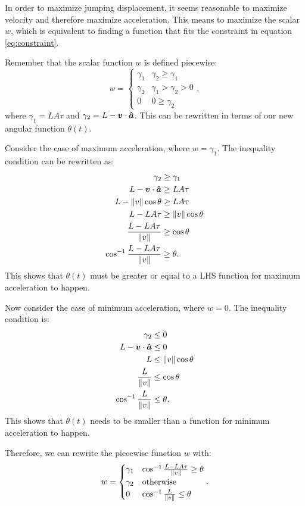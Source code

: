 In order to maximize jumping displacement, it seems reasonable to maximize velocity and therefore maximize acceleration. This means to maximize the scalar $w$, which is equivalent to finding a function that fits the constraint in equation \ref{eq:constraint}.

Remember that the scalar function $w$ is defined piecewise:
\[
    w = \begin{cases}
        \gamma_1 & \gamma_2 \ge \gamma_1\\
     \gamma_2 & \gamma_1 > \gamma_2 > 0\\
     0 & 0 \ge \gamma_2
    \end{cases},
\]
where $\gamma_1 = LA\tau$ and $\gamma_2 = L - \boldsymbol{v} \cdot \boldsymbol{\hat{a}}$. This can be rewritten in terms of our new angular function $\theta(t)$.

Consider the case of maximum acceleration, where $w=\gamma_1$. The inequality condition can be rewritten as:
\begin{align*}
    \gamma_2 &\ge \gamma_1\\
    L - \boldsymbol{v} \cdot \boldsymbol{\hat{a}} &\ge LA\tau\\
    L - \|v\| \cos \theta &\ge LA \tau\\
    L - LA\tau &\ge \|v\| \cos \theta\\
    \frac{L - LA\tau}{\|v\|} &\ge \cos \theta\\
    \cos^{-1} \frac{L - LA\tau}{\|v\|} &\ge \theta.
\end{align*}
This shows that $\theta(t)$ must be greater or equal to a LHS function for maximum acceleration to happen.

Now consider the case of minimum acceleration, where $w=0$. The inequality condition is:
\begin{align*}
    \gamma_2 &\le 0\\
    L - \boldsymbol{v} \cdot \boldsymbol{\hat{a}} &\le 0\\
    L &\le \|v\| \cos \theta\\
    \frac{L}{\|v\|} &\le \cos \theta\\
    \cos^{-1}  \frac{L}{\|v\|} &\le \theta.
\end{align*}
This shows that $\theta(t)$ needs to be smaller than a function for minimum acceleration to happen.

Therefore, we can rewrite the piecewise function $w$ with:
\[
w = \begin{cases}
    \gamma_1 & \cos^{-1} \frac{L - LA\tau}{\|v\|} \ge \theta\\
    \gamma_2 & \text{otherwise}\\
    0 & \cos^{-1}  \frac{L}{\|v\|} \le \theta
\end{cases}.
\]

